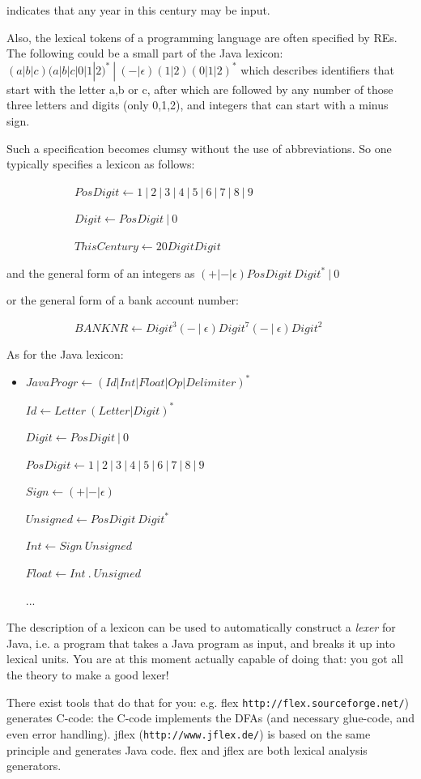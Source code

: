 indicates that any year in this century may be input.

Also, the lexical tokens of a programming language are often specified
by REs. The following could be a small part of the Java lexicon:
$(a|b|c)(a|b|c|0|1|2)^*~|~(-|\epsilon)(1|2)(0|1|2)^*$ which describes
identifiers that start with the letter a,b or c, after which are
followed by any number of those three letters and digits (only 0,1,2),
and integers that can start with a minus sign.

Such a specification becomes clumsy without the use of
abbreviations. So one typically specifies a lexicon as follows:


~~~~~~~~~~~~$PosDigit \leftarrow 1~|~2~|~3~|~4~|~5~|~6~|~7~|~8~|~9$

~~~~~~~~~~~~$Digit \leftarrow PosDigit~|~0$


~~~~~~~~~~~~$ThisCentury \leftarrow 20DigitDigit$

and the general form of an integers as $(+|-|\epsilon)PosDigit~Digit^*~|~0$

or the general form of a bank account number:


~~~~~~~~~~~~$BANKNR \leftarrow Digit^3(-~|~\epsilon)Digit^7(-~|~\epsilon)Digit^2$

As for the Java lexicon:

\begin{itemize}
\item[]
$JavaProgr \leftarrow (Id|Int|Float|Op|Delimiter)^*$

$Id \leftarrow Letter~(Letter|Digit)^*$

$Digit \leftarrow PosDigit~|~0$

$PosDigit \leftarrow 1~|~2~|~3~|~4~|~5~|~6~|~7~|~8~|~9$

$Sign \leftarrow (+|-|\epsilon)$

$Unsigned \leftarrow PosDigit~Digit^*$

$Int \leftarrow Sign~Unsigned$

$Float \leftarrow Int~.~Unsigned$

...
\end{itemize}

\label{flexlabel}
The description of a lexicon can be used to automatically construct a
{\em lexer} for Java, i.e. a program that takes a Java program as input,
and breaks it up into lexical units. You are at this moment actually
capable of doing that: you got all the theory to make a good lexer!

There exist tools that do that for you: e.g. flex
\verb|http://flex.sourceforge.net/|) generates C-code: the C-code
implements the DFAs (and necessary glue-code, and even error
handling). jflex (\verb|http://www.jflex.de/|) is based on the same principle and generates Java code. flex and jflex are both lexical
analysis generators.

